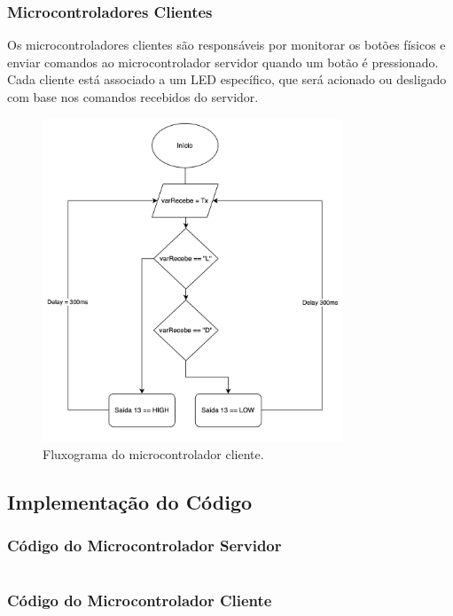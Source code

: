 \documentclass[12pt, a4paper]{article}
\begin{document}
\subsubsection{Microcontroladores Clientes}
Os microcontroladores clientes são responsáveis por monitorar os botões físicos e enviar comandos ao microcontrolador servidor quando um botão é pressionado. Cada cliente está associado a um LED específico, que será acionado ou desligado com base nos comandos recebidos do servidor.
\begin{figure}[H]
	\centering
	\includegraphics[width=0.8\textwidth]{fluxograma_cliente.png}
	\caption{Fluxograma do microcontrolador cliente.}
\end{figure}
\label{fig:fluxograma_cliente}
\subsection{Implementação do Código}
\subsubsection{Código do Microcontrolador Servidor}
\begin{mybox}[label={lst:codigo_servidor},title={Código do Microcontrolador Servidor}]{}
	\inputminted[fontsize=\footnotesize,breaklines,linenos]{cpp}{./arduino/codigo_servidor/codigo_servidor.ino}
\end{mybox}
\subsubsection{Código do Microcontrolador Cliente}
\begin{mybox}[label={lst:codigo_cliente},title={Código do Microcontrolador Cliente}]{}
	\inputminted[fontsize=\footnotesize,breaklines,linenos]{cpp}{./arduino/codigo_cliente/codigo_cliente.ino}
\end{mybox}
\newpage
\end{document}
